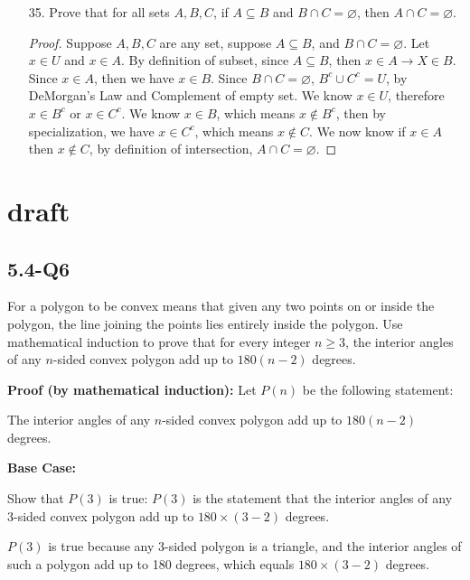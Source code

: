 \documentclass[12pt]{article}
\newcommand{\then}{\rightarrow}
\begin{document}
\begin{enumerate}
\begin{enumerate}
                \item[35.] Prove that for all sets $A,B,C$, if $A \subseteq B$ and $B \cap C =\varnothing$, then $A \cap C = \varnothing$.
                    \begin{proof}
                        Suppose $A,B,C$ are any set, suppose $A \subseteq B$, and $B \cap C = \varnothing$. Let $x \in U$ and $x \in A$. By definition of subset, since $A \subseteq B$, then $x \in A \then X \in B$. Since $x \in A$, then we have $x \in B$. Since $B \cap C = \varnothing$, $B^c \cup C^c = U$, by DeMorgan's Law and Complement of empty set. We know $x \in U$, therefore $ x \in B^c$ or $x \in C^c$. We know $ x \in B$, which means $ x\notin B^c$, then by specialization, we have $x \in C^c$, which means $x \notin C$. We now know if $x \in A$ then $x \notin C$, by definition of intersection, $A \cap C = \varnothing$.
                    \end{proof}
                
        \end{enumerate}

        
        




\end{enumerate}


\section{draft}
\subsection{5.4-Q6}
For a polygon to be convex means that given any two points on or inside the polygon, the line joining the points lies entirely inside the polygon. Use mathematical induction to prove that for every integer \( n \geq 3 \), the interior angles of any \( n \)-sided convex polygon add up to \( 180(n - 2) \) degrees.

\textbf{Proof (by mathematical induction):} Let \( P(n) \) be the following statement:

The interior angles of any \( n \)-sided convex polygon add up to \( 180(n - 2) \) degrees.

\textbf{Base Case:} 

Show that \( P(3) \) is true: \( P(3) \) is the statement that the interior angles of any 3-sided convex polygon add up to \( 180 \times (3 - 2) \) degrees.

\( P(3) \) is true because any 3-sided polygon is a triangle, and the interior angles of such a polygon add up to 180 degrees, which equals \( 180 \times (3 - 2) \) degrees.
\end{document}
